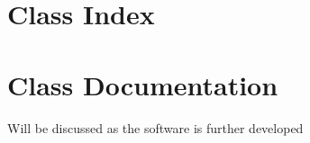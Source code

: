 
\chapter{Class Index}

\chapter{Class Documentation}

Will be discussed as the software is further developed
